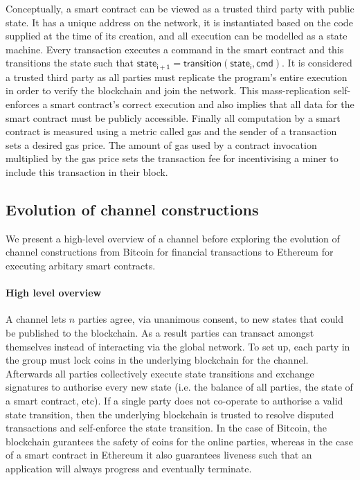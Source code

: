 \documentclass{llncs}
\newcommand{\stateinfoi}{\mathsf{state}_{\mathsf{i}}}
\newcommand{\stateinfoplus}{\mathsf{state}_{\mathsf{i+1}}}
\begin{document}
	Conceptually, a smart contract can be viewed as a trusted third party with public state. 
	It has a unique address on the network, it is instantiated based on the code supplied at the time of its creation, and all execution can be modelled as a state machine. 
	Every transaction executes a command in the smart contract and this transitions the state such that $\stateinfoplus = \mathsf{transition}(\stateinfoi, \mathsf{cmd})$. 
	It is considered a trusted third party as all parties must replicate the program's entire execution in order to verify the blockchain and join the network.  
	This mass-replication self-enforces a smart contract's correct execution and also implies that all data for the smart contract must be publicly accessible. 
	Finally all computation by a smart contract is measured using a metric called gas and the sender of a transaction sets a desired gas price. 
	The amount of gas used by a contract invocation multiplied by the gas price sets the transaction fee for incentivising a miner to include this transaction in their block. 
	
	\subsection{Evolution of channel constructions}
	
	We present a high-level overview of a channel before exploring the evolution of channel constructions from  Bitcoin for financial transactions to Ethereum for executing arbitary smart contracts. 
	
	\paragraph{High level overview}
	A channel lets $n$ parties agree, via unanimous consent, to new states that could be published to the blockchain. 
	As a result parties can transact amongst themselves instead of interacting via the global network. 
	To set up, each party in the group must lock coins in the underlying blockchain for the channel. 
	Afterwards all parties collectively execute state transitions and exchange signatures to authorise every new state (i.e. the balance of all parties, the state of a smart contract, etc). 
	If a single party does not co-operate to authorise a valid state transition, then the underlying blockchain is trusted to resolve disputed transactions and self-enforce the state transition. 
	In the case of Bitcoin, the blockchain gurantees the safety of coins for the online parties, whereas in the case of a smart contract in Ethereum it also guarantees liveness such that an application will always progress and eventually terminate. 
	
\end{document}
